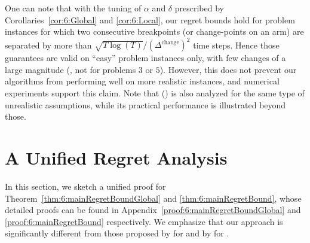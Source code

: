 One can note that with the tuning of $\alpha$ and $\delta$ prescribed by Corollaries~\ref{cor:6:Global} and \ref{cor:6:Local}, our regret bounds hold for problem instances for which two consecutive breakpoints (or change-points on an arm) are separated by more than $\sqrt{T\log(T)}/(\Delta^{\text{change}})^2$ time steps.
Hence those guarantees are valid on ``easy'' problem instances only, with few changes of a large magnitude (\eg, not for problems $3$ or $5$).
%
However, this does not prevent our algorithms from performing well on more realistic instances, and numerical experiments support this claim.
Note that \MUCB{} (\cite{CaoZhenKvetonXie18}) is also analyzed for the same type of unrealistic assumptions, while its practical performance is illustrated beyond those.


\section{A Unified Regret Analysis}
\label{sec:6:RegretAnalysis}


In this section, we sketch a unified proof for Theorem~\ref{thm:6:mainRegretBoundGlobal} and \ref{thm:6:mainRegretBound}, whose detailed proofs can be found in Appendix~\ref{proof:6:mainRegretBoundGlobal} and \ref{proof:6:mainRegretBound} respectively.
We emphasize that our approach is significantly different from those proposed by \cite{CaoZhenKvetonXie18} for \MUCB{} and by \cite{LiuLeeShroff17} for \CUSUMUCB.

